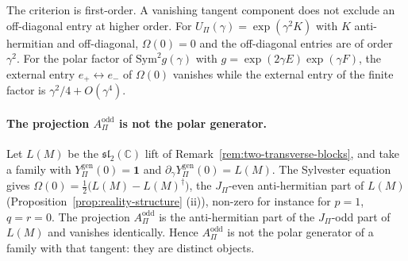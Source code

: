 \documentclass[11pt]{article}
\theoremstyle{definition}
\theoremstyle{remark}
\newcommand{\JPi}{J_{\Pi}}
\newcommand{\Ygen}{{Y^{\mathrm{gen}}_{\Pi}}}
\newcommand{\Upi}{U_{\Pi}}
\newcommand{\Opol}{\Omega}
\newcommand{\Aodd}{A_{\Pi}^{\mathrm{odd}}}
\newcommand{\Sym}{\mathrm{Sym}}
\begin{document}
    The criterion is first-order.
    A vanishing tangent component does not exclude an off-diagonal entry at higher order.
    For $\Upi(\gamma) = \exp(\gamma^{2}K)$ with $K$ anti-hermitian and off-diagonal, $\Opol(0) = 0$ and the off-diagonal
    entries are of order $\gamma^{2}$.
    For the polar factor of $\Sym^{2}g(\gamma)$ with $g = \exp(2\gamma E)\exp(\gamma F)$, the external entry
    $e_{+} \leftrightarrow e_{-}$ of $\Opol(0)$ vanishes while the external entry of the finite factor is
    $\gamma^{2}/4 + O(\gamma^{4})$.

    \paragraph{The projection \texorpdfstring{$\Aodd$}{A\_Pi odd} is not the polar generator.}
      Let $L(M)$ be the $\mathfrak{sl}_{2}(\mathbb{C})$ lift of Remark~\ref{rem:two-transverse-blocks}, and take a
      family with $\Ygen(0) = \mathbf{1}$ and $\partial_{\gamma}\Ygen(0) = L(M)$.
      The Sylvester equation gives $\Opol(0) = \tfrac12\big(L(M) - L(M)^{\dagger}\big)$, the $\JPi$-even
      anti-hermitian part of $L(M)$ (Proposition~\ref{prop:reality-structure} (ii)), non-zero for instance for
      $p = 1$, $q = r = 0$.
      The projection $\Aodd$ is the anti-hermitian part of the $\JPi$-odd part of $L(M)$ and vanishes identically.
      Hence $\Aodd$ is not the polar generator of a family with that tangent: they are distinct objects.
\end{document}
